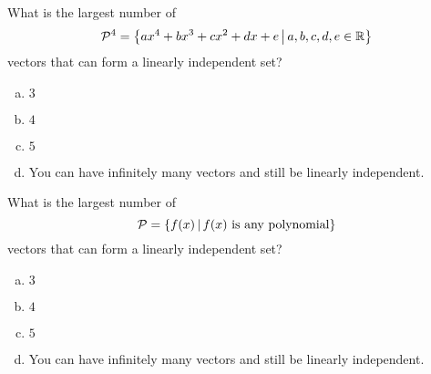 \begin{activity}{5}
What is the largest number of 
\[\mathcal{P}^4=\left\{ax^4+bx^3+cx^2+dx+e\,\middle|\,a,b,c,d,e\in\mathbb{R}\right\}\]
vectors that can form a linearly independent set?
\begin{enumerate}[(a)]
\item \(3\)
\item \(4\)
\item \(5\)
\item You can have infinitely many vectors and still be linearly independent.
\end{enumerate}
\end{activity}

\begin{activity}{5}
What is the largest number of 
\[\mathcal{P}=\left\{f(x)\,\middle|\,f(x)\text{ is any polynomial}\right\}\]
vectors that can form a linearly independent set?
\begin{enumerate}[(a)]
\item \(3\)
\item \(4\)
\item \(5\)
\item You can have infinitely many vectors and still be linearly independent.
\end{enumerate}
\end{activity}






